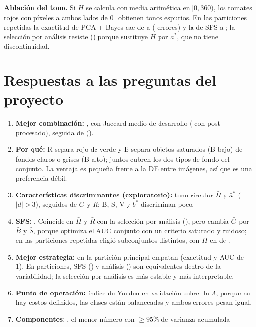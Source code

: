 \documentclass[11pt,a4paper]{article}
\begin{document}
\textbf{Ablación del tono.} Si $\bar H$ se calcula con media aritmética en $[0,360)$, los
tomates rojos con píxeles a ambos lados de $0^\circ$ obtienen tonos espurios. En las
particiones repetidas la exactitud de PCA + Bayes cae de \PcaRepKmAcc{} a \PcaRepLinAcc{}
(\PcaRepLinErr{} errores) y la de SFS a \SfsRepLinAcc; la selección por análisis resiste
(\AnRepLinAcc) porque sustituye $\bar H$ por $\bar a^*$, que no tiene discontinuidad.

\section{Respuestas a las preguntas del proyecto}

\begin{enumerate}[leftmargin=1.6em,itemsep=2pt]
\item \textbf{Mejor combinación:} \BestCombo, con Jaccard medio de desarrollo \BestDevJ{}
(\BestDevPostJ{} con post-procesado), seguida de \SecondCombo{} (\SecondDevJ).
\item \textbf{Por qué:} R separa rojo de verde y B separa objetos saturados (B bajo) de
fondos claros o grises (B alto); juntos cubren los dos tipos de fondo del conjunto. La
ventaja es pequeña frente a la DE entre imágenes, así que es una preferencia débil.
\item \textbf{Características discriminantes (exploratorio):} tono circular $\bar H$ y
$\bar a^*$ ($|d|>3$), seguidos de $\bar G$ y $\bar R$; B, S, V y $b^*$ discriminan poco.
\item \textbf{SFS:} \SFSFeatures. Coincide en $\bar H$ y $\bar R$ con la selección por
análisis (\AnalysisFeatures), pero cambia $\bar G$ por $\bar B$ y $\bar S$, porque optimiza
el AUC conjunto con un criterio saturado y ruidoso; en las particiones repetidas eligió
\SfsDistinctSubsets{} subconjuntos distintos, con $\bar H$ en \SfsWithHCount{} de \NRepeats.
\item \textbf{Mejor estrategia:} en la partición principal empatan (exactitud y AUC de 1). En
\NRepeats{} particiones, SFS (\SfsRepKmAcc) y análisis (\AnRepKmAcc) son equivalentes dentro de
la variabilidad; la selección por análisis es más estable y más interpretable.
\item \textbf{Punto de operación:} índice de Youden en validación sobre $\ln\Lambda$, porque no
hay costos definidos, las clases están balanceadas y ambos errores pesan igual.
\item \textbf{Componentes:} \PCAn, el menor número con $\ge95\%$ de varianza acumulada

\end{enumerate}
\end{document}

